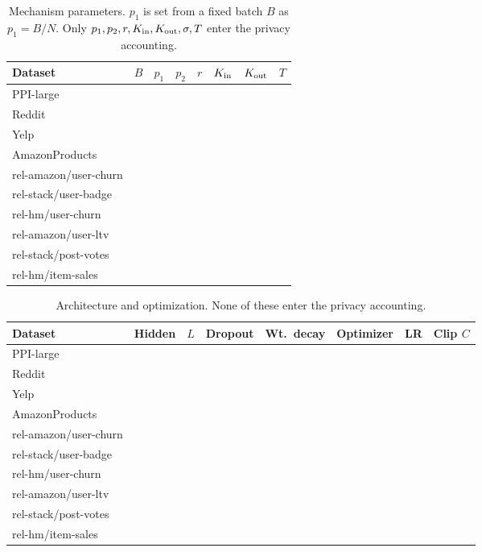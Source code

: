 \documentclass[11pt]{article}
\begin{document}
\begin{table}[H]
\centering\small
\caption{Mechanism parameters. $p_1$ is set from a fixed batch
$B$ as $p_1 = B/N$. Only $p_1, p_2, r, K_{\rm in}, K_{\rm out}, \sigma, T$
enter the privacy accounting.}
\label{tab:mech-params}
\begin{tabular}{lrrrrrrr}
\toprule
Dataset & $B$ & $p_1$ & $p_2$ & $r$ & $K_{\rm in}$ & $K_{\rm out}$ & $T$\\
\midrule
PPI-large      & & & & & & & \\
Reddit         & & & & & & & \\
Yelp           & & & & & & & \\
AmazonProducts & & & & & & & \\
\midrule
rel-amazon/user-churn & & & & & & & \\
rel-stack/user-badge  & & & & & & & \\
rel-hm/user-churn     & & & & & & & \\
\midrule
rel-amazon/user-ltv  & & & & & & & \\
rel-stack/post-votes & & & & & & & \\
rel-hm/item-sales    & & & & & & & \\
\bottomrule
\end{tabular}
\end{table}

\begin{table}[H]
\centering\small
\caption{Architecture and optimization. None of these enter the privacy
accounting.}
\label{tab:train-params}
\begin{tabular}{lrrrrlrr}
\toprule
Dataset & Hidden & $L$ & Dropout & Wt.\ decay & Optimizer & LR & Clip $C$\\
\midrule
PPI-large      & & & & & & & \\
Reddit         & & & & & & & \\
Yelp           & & & & & & & \\
AmazonProducts & & & & & & & \\
\midrule
rel-amazon/user-churn & & & & & & & \\
rel-stack/user-badge  & & & & & & & \\
rel-hm/user-churn     & & & & & & & \\
\midrule
rel-amazon/user-ltv  & & & & & & & \\
rel-stack/post-votes & & & & & & & \\
rel-hm/item-sales    & & & & & & & \\
\bottomrule
\end{tabular}
\end{table}
\end{document}
